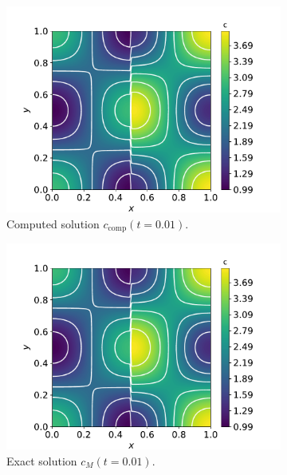 \begin{figure}
    \centering
    \begin{subfigure}{0.33\linewidth}
        \centering
        \includegraphics[width=\linewidth]{Figures/Chapter3/monoblocks/interface_condition/u_computed_t0.01.pdf}
        \caption{Computed solution $c_\mathrm{comp}(t=0.01)$.}
    \end{subfigure}%
    \begin{subfigure}{0.33\linewidth}
        \centering
        \includegraphics[width=\linewidth]{Figures/Chapter3/monoblocks/interface_condition/u_exact_t0.01.pdf}
        \caption{Exact solution $c_M(t=0.01)$.}
    \end{subfigure}%
    \begin{subfigure}{0.33\linewidth}

\end{subfigure}
\end{figure}
